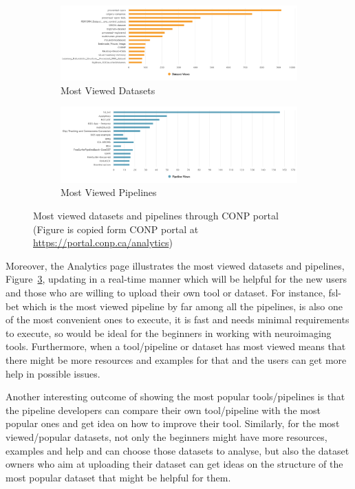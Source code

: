 \begin{figure}
\centering
\begin{subfigure}{\textwidth}  \includegraphics[width=\textwidth]{figures/mostV_datasets.png}
  \caption{Most Viewed Datasets}
  \label{fig:mostViewdDatasets}
\end{subfigure} \hfill
\begin{subfigure}{\textwidth}
  \includegraphics[width=\textwidth]{figures/mostV_pipelines.png}
  \caption{Most Viewed Pipelines}
  \label{fig:mostViewdPipelines}
\end{subfigure}
\caption{Most viewed datasets and pipelines through CONP portal \\(Figure is copied form CONP portal at \url{https://portal.conp.ca/analytics})}\label{fig:mostViewed}
\end{figure}

Moreover, the Analytics page illustrates the most viewed datasets and pipelines, Figure~\ref{fig:mostViewed}, updating in a real-time manner which will be helpful for the new users and those who are willing to upload their own tool or dataset. For instance, fsl-bet which is the most viewed pipeline by far among all the pipelines, is also one of the most convenient ones to execute, it is fast and needs minimal requirements to execute, so would be ideal for the beginners in working with neuroimaging tools. Furthermore, when a tool/pipeline or dataset has most viewed means that there might be more resources and examples for that and the users can get more help in possible issues.


Another interesting outcome of showing the most popular tools/pipelines is that the pipeline developers can compare their own tool/pipeline with the most popular ones and get idea on how to improve their tool. Similarly, for the most viewed/popular datasets, not only the beginners might have more resources, examples and help and can choose those datasets to analyse, but also the dataset owners who aim at uploading their dataset can get ideas on the structure of the most popular dataset that might be helpful for them.


